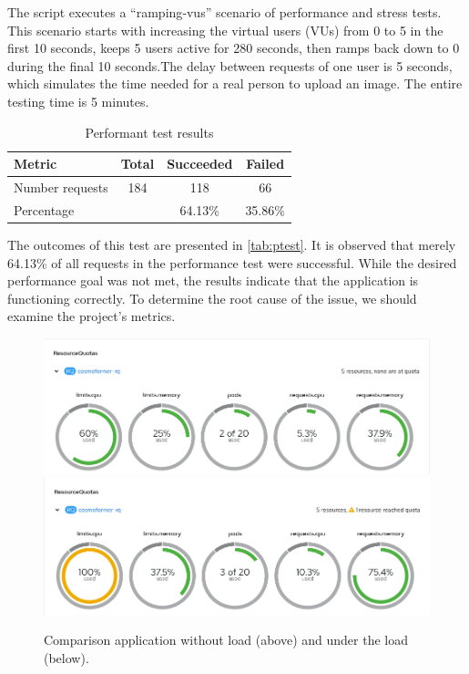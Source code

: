 The script executes a “ramping‑vus” scenario of performance and stress tests. This scenario starts with increasing the  virtual users (VUs) from 0 to 5 in the first 10 seconds, keeps 5 users active for 280 seconds, then ramps back down to 0 during the final 10 seconds.The delay between requests of one user is 5 seconds, which simulates the time needed for a real person to upload an image. The entire testing time is 5 minutes. 


\begin{table}[hbtp]
\centering
\caption{Performant test results}
\label{tab:ptest}
\begin{tabular}{|l|c|c|c|}
\hline
Metric          & Total & Succeeded & Failed    \\ \hline
Number requests & 184   & 118       & 66        \\ \hline
Percentage      &       & 64.13\%   & 35.86\%   \\ \hline
\end{tabular}
\end{table}

The outcomes of this test are presented in \autoref{tab:ptest}. It is observed that merely 64.13\% of all requests in the performance test were successful. While the desired performance goal was not met, the results indicate that the application is functioning correctly. To determine the root cause of the issue, we should examine the project's metrics.

\begin{figure}[htbp]\centering
    \centering
    \includegraphics[width=0.8\linewidth]{obrazky-figures/05-implementation/no-load.png}
    \includegraphics[width=0.8\linewidth]{obrazky-figures/05-implementation/load.png}
    \caption{Comparison application without load (above) and under the load (below).}
    \label{fig:test-load}
\end{figure}


